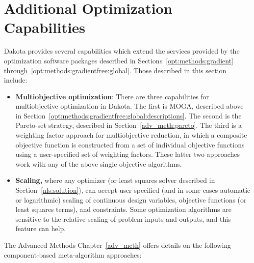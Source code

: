 \section{Additional Optimization Capabilities}
\label{opt:additional}

Dakota provides several capabilities which extend the services
provided by the optimization software packages described in
Sections~\ref{opt:methods:gradient}
through~\ref{opt:methods:gradientfree:global}. Those described in this
section include:
\begin{itemize}
\item {\bf Multiobjective optimization}: There are three capabilities
  for multiobjective optimization in Dakota. The first is MOGA,
  described above in
  Section~\ref{opt:methods:gradientfree:global:descriptions}. The
  second is the Pareto-set strategy, described in
  Section~\ref{adv_meth:pareto}. The third is a weighting factor approach for
  multiobjective reduction, in which a composite objective function is
  constructed from a set of individual objective functions using a
  user-specified set of weighting factors. These latter two approaches
  work with any of the above single objective algorithms.
\item {\bf Scaling,} where any optimizer (or least squares solver
  described in Section~\ref{nls:solution}), can accept user-specified
  (and in some cases automatic or logarithmic) scaling of continuous
  design variables, objective functions (or least squares terms), and
  constraints. Some optimization algorithms are sensitive to the
  relative scaling of problem inputs and outputs, and this feature can
  help.
\end{itemize}
The Advanced Methods Chapter~\ref{adv_meth} offers details on the 
following component-based meta-algorithm approaches:
